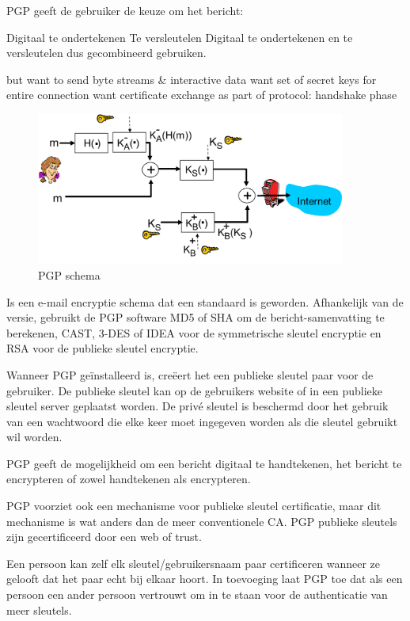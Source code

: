 \noindent PGP geeft de gebruiker de keuze om het bericht:

\bi
\itf Digitaal te ondertekenen
\itf Te versleutelen
\itf Digitaal te ondertekenen en te versleutelen dus gecombineerd gebruiken.
\ei

\bi
\itf but want to send byte streams \& interactive data
\itf want set of secret keys for entire connection
\itf want certificate exchange as part of protocol: handshake phase
\ei

\begin{figure}[h]
    \centering
\includegraphics[width=4in]{./img/imghfdst8/hfdst8puntje26.png}
    \caption{PGP schema }      
    \label{fig:PGP schema }
\end{figure}

\noindent Is een e-mail encryptie schema dat een standaard is geworden. Afhankelijk van de versie, gebruikt de PGP software MD5 of SHA om de bericht-samenvatting te berekenen, CAST, 3-DES of IDEA voor de symmetrische sleutel encryptie en RSA voor de publieke sleutel encryptie.

\noindent Wanneer PGP geïnstalleerd is, creëert het een publieke sleutel paar voor de gebruiker. De publieke sleutel kan op de gebruikers website of in een publieke sleutel server geplaatst worden. De privé sleutel is beschermd door het gebruik van een wachtwoord die elke keer moet ingegeven worden als die sleutel gebruikt wil worden.

\noindent PGP geeft de mogelijkheid om een bericht digitaal te handtekenen, het bericht te encrypteren of zowel handtekenen als encrypteren.

\noindent PGP voorziet ook een mechanisme voor publieke sleutel certificatie, maar dit mechanisme is wat anders dan de meer conventionele CA. PGP publieke sleutels zijn gecertificeerd door een web of trust. 

\noindent Een persoon kan zelf elk sleutel/gebruikersnaam paar certificeren wanneer ze gelooft dat het paar echt bij elkaar hoort. In toevoeging laat PGP toe dat als een persoon een ander persoon vertrouwt om in te staan voor de authenticatie van meer sleutels.